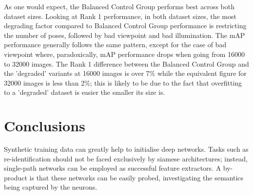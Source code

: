 \documentclass[10pt,journal,letterpaper,compsoc]{IEEEtran}
\begin{document}
\begin{table}[!htbp]
\scriptsize
	\centering
	\caption{Comparitve analysis of rendering factors of SOMAset on SOMAnet performance. The effect of a  balanced control group is compared against similarly sized datasets with bad illumination, restricted number of poses and bad camera viewpoints. The experiment was performed for 16000 and 32000 images giving a total of 8 variants of SOMAset. All variants were fine-tuned with the training partition of Market-1501 and tested on the test partition of the same dataset.}
\end{table}



As one would expect, the Balanced Control Group performs best across both dataset sizes. Looking at Rank 1 performance, in both dataset sizes, the most degrading factor compared to Balanced Control Group performance is restricting the number of poses, followed by bad viewpoint and bad illumination. The mAP performance generally follows the same pattern, except for the case of bad viewpoint where, paradoxically, mAP performance drops when going from 16000 to 32000 images. The Rank 1 difference between the Balanced Control Group and the 'degraded' variants at 16000 images is over 7\% while the equivalent figure for 32000 images is less than 2\%; this is likely to be due to the fact that overfitting to a 'degraded' dataset is easier the smaller its size is. 

 

\section{Conclusions}
\label{Conclusions}
Synthetic training data can greatly help to initialise deep networks. Tasks such as re-identification should not be faced exclusively by siamese architectures; instead, single-path networks can be employed as successful feature extractors. A by-product is that these networks can be easily probed, investigating the semantics being captured by the neurons.
\end{document}
